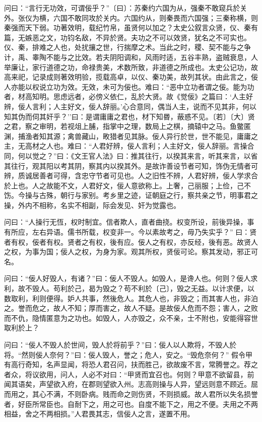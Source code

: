 \documentclass[]{article}
\begin{document}
问曰：``言行无功效，可谓佞乎？''〔曰〕：苏秦约六国为从，强秦不敢窥兵於关外。张仪为横，六国不敢同攻於关内。六国约从，则秦畏而六国强；三秦称横，则秦强而天下弱。功著效明，载纪竹帛，虽贤何以加之？太史公叙言众贤，仪、秦有篇，无嫉恶之文，功钧名敌，不异於贤。夫功之不可以效贤，犹名之不可实也。仪、秦，排难之人也，处扰攘之世，行揣摩之术。当此之时，稷、契不能与之争计，禹、睾陶不能与之比效。若夫阴阳调和，风雨时适，五谷丰熟，盗贼衰息，人举廉让，家行道德之功，命禄贵美，术数所致，非道德之所成也。太史公记功，故高来祀，记录成则著效明验，揽载高卓，以仪、秦功美，故列其状。由此言之，佞人亦能以权说立功为效。无效，未可为佞也。难曰：``恶中立功者谓之佞。能为功者，材高知明。思虑远者，必傍义依仁，乱於大贤。故《觉佞》之篇曰：`人主好辨，佞人言利；人主好文，佞人辞丽。'心合意同，偶当人主，说而不见其非，何以知其伪而伺其奸乎？''曰：是谓庸庸之君也，材下知昬，蔽惑不见。〔若〕〔大〕贤之君，察之审明，若视俎上脯，指掌中之理，数局上之棋，摘辕中之马。鱼鳖匿渊，捕渔者知其源；禽兽藏山，畋猎者见其脉。佞人异行於世，世不能见，庸庸之主，无高材之人也。难曰：``人君好辨，佞人言利；人主好文，佞人辞丽。言操合同，何以觉之？''曰：《文王官人法》曰：推其往行，以揆其来言，听其来言，以省其往行，观其阳以考其阴，察其内以揆其外。是故诈善设节者可知，饰伪无情者可辨，质诚居善者可得，含忠守节者可见也。人之旧性不辨，人君好辨，佞人学求合於上也。人之故能不文，人君好文，佞人意欲称上。上奢，己丽服；上俭，己不饬。今操与古殊，朝行与家别。考乡里之迹，证朝庭之行，察共亲之节，明事君之操，外内不相称，名实不相副，际会发见、奸为觉露也。

问曰：``人操行无恆，权时制宜。信者欺人，直者曲挠。权变所设，前後异操，事有所应，左右异语。儒书所载，权变非一。今以素故考之，毋乃失实乎？''
曰：贤者有权，佞者有权。贤者之有权，後有应。佞人之有权，亦反经，後有恶。故贤人之权，为事为国；佞人之权，为身为家。观其所权，贤佞可论。察其发动，邪正可名。

问曰：``佞人好毁人，有诸？''曰：佞人不毁人。如毁人，是谗人也。何则？佞人求利，故不毁人。苟利於己，曷为毁之？苟不利於〔己〕，毁之无益。以计求便，以数取利，利则便得。妒人共事，然後危人。其危人也，非毁之；而其害人也，非泊之。誉而危之，故人不知；厚而害之，故人不疑。是故佞人危而不怨；害人，之败而不仇，隐情匿意为之功也。如毁人，人亦毁之，众不亲，士不附也，安能得容世取利於上？

问曰：``佞人不毁人於世间，毁人於将前乎？''曰：佞人以人欺将，不毁人於将。``然则佞人奈何？''曰：佞人毁人，誉之；危人，安之。``毁危奈何？''
假令甲有高行奇知，名声显闻，将恐人君召问，扶而胜己，欲故废不言，常腾誉之。荐之者众，将议欲用，问人，人必不对曰：``甲贤而宜召也。何则？甲意不欲留县，前闻其语矣，声望欲入府，在郡则望欲入州。志高则操与人异，望远则意不顾近。屈而用之，其心不满，不则卧病。贱而命之则伤贤，不则损威。故人君所以失名损誉者，好臣所常臣也。自耐下之，用之可也。自度不能下之，用之不便。夫用之不两相益，舍之不两相损。''人君畏其志，信佞人之言，遂置不用。
\end{document}
